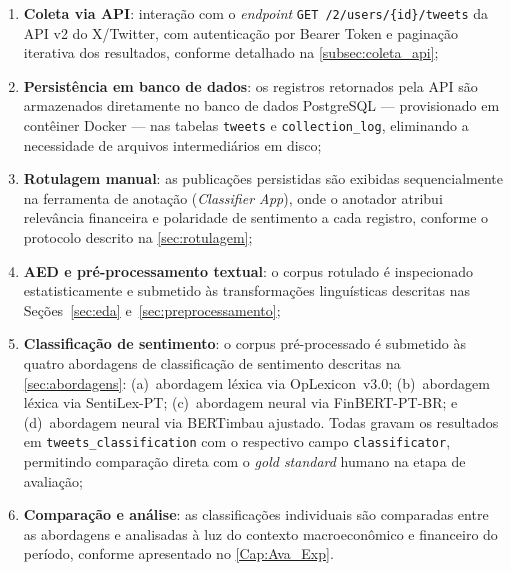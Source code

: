 \begin{enumerate}
	\item \textbf{Coleta via API}: interação com o \textit{endpoint} \texttt{GET /2/users/\{id\}/tweets} da API v2 do X/Twitter, com autenticação por Bearer Token e paginação iterativa dos resultados, conforme detalhado na \autoref{subsec:coleta_api};
	
	\item \textbf{Persistência em banco de dados}: os registros retornados pela API são armazenados diretamente no banco de dados PostgreSQL — provisionado em contêiner Docker — nas tabelas
	\texttt{tweets} e \texttt{collection\_log}, eliminando a necessidade de arquivos intermediários em disco;
	
	\item \textbf{Rotulagem manual}: as publicações persistidas são exibidas sequencialmente na ferramenta de anotação (\textit{Classifier App}), onde o anotador atribui relevância financeira e polaridade de sentimento a cada registro, conforme o protocolo descrito na \autoref{sec:rotulagem};
	
	\item \textbf{AED e pré-processamento textual}: o corpus rotulado é inspecionado estatisticamente e submetido às transformações linguísticas descritas nas Seções~\ref{sec:eda} 	e~\ref{sec:preprocessamento};
	
	\item \textbf{Classificação de sentimento}: o corpus pré-processado é submetido às quatro abordagens de classificação de sentimento descritas na \autoref{sec:abordagens}: (a)~abordagem léxica via OpLexicon~v3.0; (b)~abordagem léxica via SentiLex-PT; (c)~abordagem neural via FinBERT-PT-BR; e (d)~abordagem neural via BERTimbau ajustado. Todas gravam os resultados em \texttt{tweets\_classification} com o respectivo campo \texttt{classificator}, permitindo comparação direta com o \textit{gold standard} humano na etapa de avaliação;
	
	\item \textbf{Comparação e análise}: as classificações individuais são comparadas entre as abordagens e analisadas à luz do contexto macroeconômico e financeiro do período, conforme apresentado no \autoref{Cap:Ava_Exp}.
\end{enumerate}

